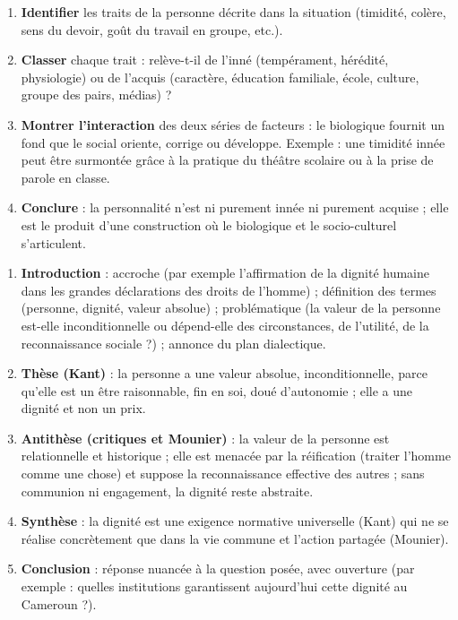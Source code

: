 \documentclass[11pt]{article}
\newcommand{\cle}[1]{{\popxbold\color{popdark}#1}}
\begin{document}
\begin{methode}
\begin{enumerate}
  \item \textbf{Identifier} les traits de la personne décrite dans la situation (timidité, colère, sens du devoir, goût du travail en groupe, etc.).
  \item \textbf{Classer} chaque trait : relève-t-il de l'inné (tempérament, hérédité, physiologie) ou de l'acquis (caractère, éducation familiale, école, culture, groupe des pairs, médias) ?
  \item \textbf{Montrer l'interaction} des deux séries de facteurs : le biologique fournit un fond que le social oriente, corrige ou développe. Exemple : une timidité innée peut être surmontée grâce à la pratique du théâtre scolaire ou à la prise de parole en classe.
  \item \textbf{Conclure} : la personnalité n'est ni purement innée ni purement acquise ; elle est le produit d'une construction où le biologique et le socio-culturel s'articulent.
\end{enumerate}
\end{methode}

\begin{methode}
\begin{enumerate}
  \item \textbf{Introduction} : accroche (par exemple l'affirmation de la dignité humaine dans les grandes déclarations des droits de l'homme) ; définition des termes (\cle{personne}, \cle{dignité}, \cle{valeur absolue}) ; problématique (la valeur de la personne est-elle inconditionnelle ou dépend-elle des circonstances, de l'utilité, de la reconnaissance sociale ?) ; annonce du plan dialectique.
  \item \textbf{Thèse (Kant)} : la personne a une valeur absolue, inconditionnelle, parce qu'elle est un être raisonnable, fin en soi, doué d'autonomie ; elle a une dignité et non un prix.
  \item \textbf{Antithèse (critiques et Mounier)} : la valeur de la personne est relationnelle et historique ; elle est menacée par la réification (traiter l'homme comme une chose) et suppose la reconnaissance effective des autres ; sans communion ni engagement, la dignité reste abstraite.
  \item \textbf{Synthèse} : la dignité est une exigence normative universelle (Kant) qui ne se réalise concrètement que dans la vie commune et l'action partagée (Mounier).
  \item \textbf{Conclusion} : réponse nuancée à la question posée, avec ouverture (par exemple : quelles institutions garantissent aujourd'hui cette dignité au Cameroun ?).
\end{enumerate}
\end{methode}
\end{document}
